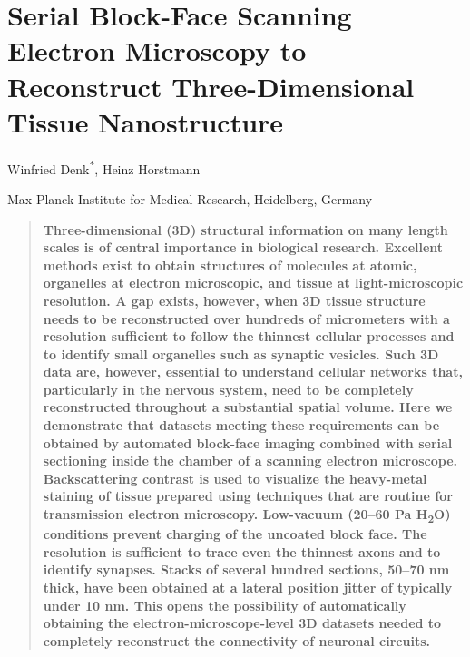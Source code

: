 \documentclass{article}
\begin{document}

\section*{Serial Block-Face Scanning Electron Microscopy to Reconstruct Three-Dimensional Tissue Nanostructure}

\noindent Winfried Denk\textsuperscript{*}, Heinz Horstmann

\noindent Max Planck Institute for Medical Research, Heidelberg, Germany

\begin{quote}
\textbf{Three-dimensional (3D) structural information on many length scales is of central importance in biological research. Excellent methods exist to obtain structures of molecules at atomic, organelles at electron microscopic, and tissue at light-microscopic resolution. A gap exists, however, when 3D tissue structure needs to be reconstructed over hundreds of micrometers with a resolution sufficient to follow the thinnest cellular processes and to identify small organelles such as synaptic vesicles. Such 3D data are, however, essential to understand cellular networks that, particularly in the nervous system, need to be completely reconstructed throughout a substantial spatial volume. Here we demonstrate that datasets meeting these requirements can be obtained by automated block-face imaging combined with serial sectioning inside the chamber of a scanning electron microscope. Backscattering contrast is used to visualize the heavy-metal staining of tissue prepared using techniques that are routine for transmission electron microscopy. Low-vacuum (20–60 Pa H\textsubscript{2}O) conditions prevent charging of the uncoated block face. The resolution is sufficient to trace even the thinnest axons and to identify synapses. Stacks of several hundred sections, 50–70 nm thick, have been obtained at a lateral position jitter of typically under 10 nm. This opens the possibility of automatically obtaining the electron-microscope-level 3D datasets needed to completely reconstruct the connectivity of neuronal circuits.}
\end{quote}
\end{document}
